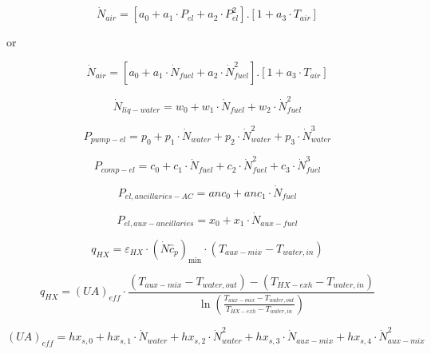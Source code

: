 \begin{equation}
{\dot N_{air}} = \left[ {{a_0} + {a_1} \cdot {P_{el}} + {a_2} \cdot P_{el}^2} \right].\left[ {1 + {a_3} \cdot {T_{air}}} \right]
\end{equation}

or

\begin{equation}
{\dot N_{air}} = \left[ {{a_0} + {a_1} \cdot {{\dot N}_{fuel}} + {a_2} \cdot \dot N_{fuel}^2} \right].\left[ {1 + {a_3} \cdot {T_{air}}} \right]
\end{equation}

\begin{equation}
{\dot N_{liq - water}} = {w_0} + {w_1} \cdot {\dot N_{fuel}} + {w_2} \cdot \dot N_{fuel}^2
\end{equation}

\begin{equation}
{P_{pump - el}} = {p_0} + {p_1} \cdot {\dot N_{water}} + {p_2} \cdot \dot N_{water}^2 + {p_3} \cdot \dot N_{water}^3
\end{equation}

\begin{equation}
{P_{comp - el}} = {c_0} + {c_1} \cdot {\dot N_{fuel}} + {c_2} \cdot \dot N_{fuel}^2 + {c_3} \cdot \dot N_{fuel}^3
\end{equation}

\begin{equation}
{P_{el,ancillaries - AC}} = an{c_0} + an{c_1} \cdot {\dot N_{fuel}}
\end{equation}

\begin{equation}
{P_{el,aux - ancillaries}} = {x_0} + {x_1} \cdot {\dot N_{aux - fuel}}
\end{equation}

\begin{equation}
{q_{HX}} = {\varepsilon_{HX}} \cdot {\left( {\dot N{{\hat c}_p}} \right)_{\min }} \cdot \left( {{T_{aux - mix}} - {T_{water,in}}} \right)
\end{equation}

\begin{equation}
{q_{HX}} = {\left( {UA} \right)_{eff}} \cdot \frac{{\left( {{T_{aux - mix}} - {T_{water,out}}} \right) - \left( {{T_{HX - exh}} - {T_{water,in}}} \right)}}{{\ln \left( {\frac{{{T_{aux - mix}} - {T_{water,out}}}}{{{T_{HX - exh}} - {T_{water,in}}}}} \right)}}
\end{equation}

\begin{equation}
{\left( {UA} \right)_{eff}} = h{x_{s,0}} + h{x_{s,1}} \cdot {\dot N_{water}} + h{x_{s,2}} \cdot \dot N_{water}^2 + h{x_{s,3}} \cdot {\dot N_{aux - mix}} + h{x_{s,4}} \cdot \dot N_{aux - mix}^2
\end{equation}

